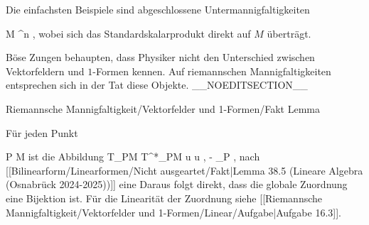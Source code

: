 Die einfachsten Beispiele sind abgeschlossene Untermannigfaltigkeiten

\mavergleichskette
{\vergleichskette
{M
}
{ \subseteq }{ \R^n
}
{  }{
}
{    }{
}
{   }{
}
}
{}{}{,}
wobei sich das Standardskalarprodukt direkt auf $M$ überträgt.


Böse Zungen behaupten, dass Physiker nicht den Unterschied zwischen Vektorfeldern und $1$-Formen kennen. Auf riemannschen Mannigfaltigkeiten entsprechen sich in der Tat diese Objekte.
__NOEDITSECTION__

{Riemannsche Mannigfaltigkeit/Vektorfelder und 1-Formen/Fakt}
{Lemma}
{}
{

\faktzusatz {}
\faktzusatz {}

}
{

Für jeden Punkt

\mavergleichskette
{\vergleichskette
{P
}
{ \in }{ M
}
{  }{
}
{    }{
}
{   }{
}
}
{}{}{}
ist die Abbildung
\maabbeledisp {} {T_PM} {T^*_PM
} { u } { \left\langle  u  ,  -  \right\rangle_P
} {,}
nach
[[Bilinearform/Linearformen/Nicht ausgeartet/Fakt|Lemma 38.5 (Lineare Algebra (Osnabrück 2024-2025))]]
eine
Daraus folgt direkt, dass die globale Zuordnung eine Bijektion ist. Für die Linearität der Zuordnung siehe
[[Riemannsche Mannigfaltigkeit/Vektorfelder und 1-Formen/Linear/Aufgabe|Aufgabe 16.3]].

}

